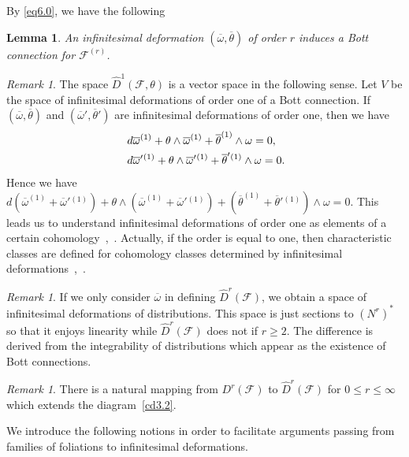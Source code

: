 \documentclass[12pt]{amsart}
\newcommand{\CF}{{\mathcal F}}
\newtheorem{lemma}[theorem]{Lemma}
\theoremstyle{definition}
\theoremstyle{remark}
\newtheorem{remark}[theorem]{Remark}
\begin{document}
By \eqref{eq6.0}, we have the following
\begin{lemma}
An infinitesimal deformation $(\overline{\omega},\overline{\theta})$ of order $r$ induces a Bott connection for $\CF^{(r)}$.
\end{lemma}

\begin{remark}
The space $\widehat{D}^1(\mathcal{F},\theta)$ is a vector space in the following sense.
Let $V$ be the space of infinitesimal deformations of order one of a Bott connection.
If $(\overline{\omega},\overline{\theta})$ and $(\overline{\omega}',\overline{\theta}')$ are infinitesimal deformations of order one, then we have
\begin{align*}
&d\overline{\omega}^{(1)}+\theta\wedge\overline{\omega}^{(1)}+\overline{\theta}^{(1)}\wedge\omega=0,\\
&d\overline{\omega}'{}^{(1)}+\theta\wedge\overline{\omega}'{}^{(1)}+\overline{\theta}'{}^{(1)}\wedge\omega=0\rlap{.}
\end{align*}
Hence we have $d(\overline{\omega}^{(1)}+\overline{\omega}'{}^{(1)})+\theta\wedge(\overline{\omega}^{(1)}+\overline{\omega}'{}^{(1)})+(\overline{\theta}^{(1)}+\overline{\theta}'{}^{(1)})\wedge\omega=0$.
This leads us to understand infinitesimal deformations of order one as elements of a certain cohomology~\cite{12},~\cite{13}.
Actually, if the order is equal to one, then characteristic classes are defined for cohomology classes determined by infinitesimal deformations~\cite{13},~\cite{asuke:UT}.
\end{remark}

\begin{remark}
If we only consider $\overline{\omega}$ in defining $\widehat{D}^r(\CF)$, we obtain a space of infinitesimal deformations of distributions.
This space is just sections to $(N^r)^*$ so that it enjoys linearity while $\widehat{D}^r(\CF)$ does not if $r\geq2$.
The difference is derived from the integrability of distributions which appear as the existence of Bott connections.
\end{remark}

\begin{remark}
There is a natural mapping from $D^r(\CF)$ to $\widehat{D}^r(\CF)$ for $0\leq r\leq\infty$ which extends the diagram~\eqref{cd3.2}.
\end{remark}

We introduce the following notions in order to facilitate arguments passing from families of foliations to infinitesimal deformations.
\end{document}
